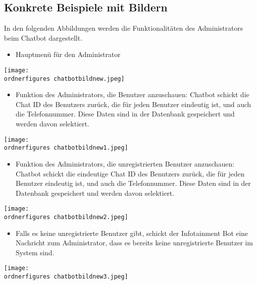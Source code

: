 \subsection{Konkrete Beispiele mit Bildern} 
In den folgenden Abbildungen werden die Funktionalitäten des Administrators beim Chatbot dargestellt.
\begin{itemize}
	\item Hauptmen\"u f\"ur den Administrator
\end{itemize}
\begin{center}
	\captionsetup{type=figure}
	\texttt{[image: \\ordnerfigures chatbotbildnew.jpeg]}
	\caption{Hauptmen\"u f\"ur den Administrator} 
	\label{fig:menuadmin}
\end{center}
\begin{itemize}
	\item Funktion des Administrators, die Benutzer anzuschauen: Chatbot schickt die Chat ID des Benutzers zurück, die für jeden Benutzer eindeutig ist, und auch die Telefonnummer. Diese Daten sind in der Datenbank gespeichert und werden davon selektiert.
\end{itemize}
\begin{center}
	\captionsetup{type=figure}
	\texttt{[image: \\ordnerfigures chatbotbildnew1.jpeg]}
	\caption{Auflistung der Chatbot-Benutzer} 
	\label{fig:chatbotbenutzer}
\end{center}
\begin{itemize}
	\item Funktion des Administrators, die unregistrierten Benutzer anzuschauen: Chatbot schickt die eindeutige Chat ID des Benutzers zurück, die für jeden Benutzer eindeutig ist, und auch die Telefonnummer. Diese Daten sind in der Datenbank gespeichert und werden davon selektiert.
\end{itemize}
\begin{center}
	\captionsetup{type=figure}
	\texttt{[image: \\ordnerfigures chatbotbildnew2.jpeg]}
	\caption{Auflistung der unregistrierten Benutzer}
	\label{chatbotben}
\end{center}
\begin{itemize}
	\item Falls es keine unregistrierte Benutzer gibt, schickt der Infotainment Bot eine Nachricht zum Administrator, dass es bereits keine unregistrierte Benutzer im System sind.
\end{itemize}
\begin{center}
	\captionsetup{type=figure}
	\texttt{[image: \\ordnerfigures chatbotbildnew3.jpeg]}
	\caption{Keine Unregistrierte Benutzer}
	\label{chatbotbenf}
\end{center}
